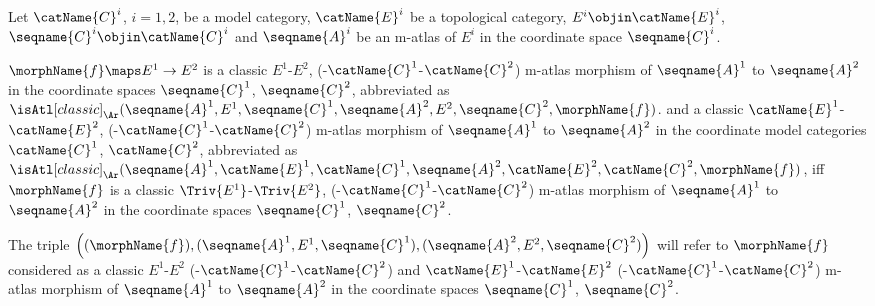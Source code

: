 \documentclass{article}
\begin{document}
\begin{definition}
\label{def:M-ATLcmorphtop}
Let $\catName{C}^i$, $i=1,2$, be a model category, $\catName{E}^i$ be a
topological category, $E^i \objin \catName{E}^i$,
$\seqname{C}^i \objin \catName{C}^i$ and $\seqname{A}^i$ be an m-atlas
of $E^i$ in the coordinate space $\seqname{C}^i$.

$\morphName{f} \maps E^1 \to E^2$ is a classic
\nobreaks
  {
    {$E^1$-$E^2$},
    {(-$\catName{C}^1$-$\catName{C}^2$)}
  }
m-atlas morphism of $\seqname{A}^1$ to $\seqname{A}^2$ in the coordinate
spaces $\seqname{C}^1$, $\seqname{C}^2$, abbreviated as
$
  \isAtl[classic]_\Ar
  (
    \seqname{A}^1,
    E^1,
    \seqname{C}^1,
    \seqname{A}^2,
    E^2,
    \seqname{C}^2,
    \morphName{f}
  )
$.
and a classic
\nobreaks
  {
    {$\catName{E}^1$-$\catName{E}^2$},
    {(-$\catName{C}^1$-$\catName{C}^2$)}
  }
m-atlas morphism of $\seqname{A}^1$ to $\seqname{A}^2$ in the coordinate
model categories $\catName{C}^1$, $\catName{C}^2$, abbreviated as
$
  \isAtl[classic]_\Ar
  (
    \seqname{A}^1,
    \catName{E}^1,
    \catName{C}^1,
    \seqname{A}^2,
    \catName{E}^2,
    \catName{C}^2,
    \morphName{f}
  )
$,
iff $\morphName{f}$ is a classic
\nobreaks
  {
    {$\Triv{E^1}$-$\Triv{E^2}$},
    {(-$\catName{C}^1$-$\catName{C}^2$)}
  }
m-atlas
morphism of $\seqname{A}^1$ to $\seqname{A}^2$ in the coordinate spaces
$\seqname{C}^1$, $\seqname{C}^2$.

The triple
$
  \Bigl (
    (\morphName{f}),
    (\seqname{A}^1, E^1, \seqname{C}^1),
    (\seqname{A}^2, E^2, \seqname{C}^2)
  \Bigr )
$
will refer to $\morphName{f}$ considered as a classic
\nobreaks
  {
    {$E^1$-$E^2$}%
    {(-$\catName{C}^1$-$\catName{C}^2$)}
  }
and
\nobreaks
  {
    {$\catName{E}^1$-$\catName{E}^2$}%
    {(-$\catName{C}^1$-$\catName{C}^2$)}
  }
m-atlas morphism of $\seqname{A}^1$ to $\seqname{A}^2$ in the coordinate
spaces $\seqname{C}^1$, $\seqname{C}^2$.
\end{definition}
\end{document}
